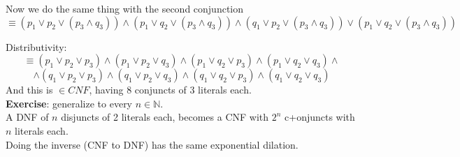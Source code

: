 	Now we do the same thing with the second conjunction
	$$ \equiv (p_1 \vee p_2 \vee (p_3 \wedge q_3)) \wedge (p_1 \vee q_2 \vee (p_3 \wedge q_3)) \wedge
	(q_1 \vee p_2 \vee (p_3 \wedge q_3)) \vee
	(p_1 \vee q_2 \vee (p_3 \wedge q_3)) $$

	Distributivity:
	$$ \equiv
	(p_1 \vee p_2 \vee p_3) \wedge
	(p_1 \vee p_2 \vee q_3) \wedge
	(p_1 \vee q_2 \vee p_3) \wedge
	(p_1 \vee q_2 \vee q_3) \wedge
	$$
	$$
	\wedge
	(q_1 \vee p_2 \vee p_3) \wedge
	(q_1 \vee p_2 \vee q_3) \wedge
	(q_1 \vee q_2 \vee p_3) \wedge
	(q_1 \vee q_2 \vee q_3)
	$$
	And this is $\in CNF$, having 8 conjuncts of 3 literals each.\\

	\textbf{Exercise}: generalize to every $n \in \mathbb{N}$.\\

	A DNF of $n$ disjuncts of 2 literals each, becomes a CNF with $2^n$ c+onjuncts with $n$ literals each.\\

	Doing the inverse (CNF to DNF) has the same exponential dilation.\\

	\newpage


